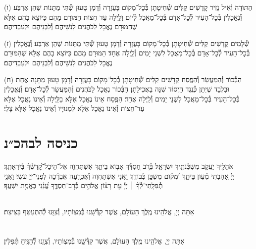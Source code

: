 \documentclass[twoside, openany, parskip=half, 11pt]{book}
\begin{document}
(ו) הַתּוֹדָה וְ֯אֵיל נָזִיר קׇדָשִׁים קַלִּים׃ שְׁ֯חִיטָתָן בְּ֯כׇל־מָקוֹם בָּעֲזָרָה וְ֯דָמָן טָעוּן שְׁ֯תֵּי מַתָּנוֹת שֶׁהֵן אַרְבַּע׃ וְ֯נֶאֱכָלִין בְּ֯כׇל־הָעִיר לְ֯כׇל־אָדָם בְּ֯כׇל־מַאֲכָל לְ֯יוֹם וָלַֽיְלָה עַד חֲצוֹת׃ הַמּוּרָם מֵהֶם כַּיּוֹצֵא בָהֶם אֶלָּא שֶׁהַמּוּרָם נֶאֱכָל לַכֹּהֲנִים לִנְשֵׁיהֶם וְ֯לִבְנֵיהֶם וּלְעַבְדֵיהֶם׃

(ז) שְׁ֯לָמִים קׇדָשִׁים קַלִּים׃ שְׁ֯חִיטָתָן בְּ֯כׇל־מָקוֹם בָּעֲזָרָה וְ֯דָמָן טָעוּן שְׁ֯תֵּי מַתָּנוֹת שֶׁהֵן אַרְבַּע׃ וְ֯נֶאֱכָלִין בְּ֯כׇל־הָעִיר לְ֯כׇל־אָדָם בְּ֯כׇל־מַאֲכָל לִשְׁנֵי יָמִים וְ֯לַֽיְלָה אֶחָד׃ הַמּוּרָם מֵהֶם כַּיּוֹצֵא בָהֶם אֶלָּא שֶׁהַמּוּרָם נֶאֱכָל לַכֹּהֲנִים לִנְשֵׁיהֶם וְ֯לִבְנֵיהֶם וּלְעַבְדֵיהֶם׃

(ח) הַבְּ֯כוֹר וְ֯הַמַּעֲשֵׂר וְ֯הַפֶּֽסַח קׇדָשִׁים קַלִּים׃ שְׁ֯חִיטָתָן בְּ֯כׇל־מָקוֹם בָּעֲזָרָה וְ֯דָמָן טָעוּן מַתָּנָה אֶחָת וּבִלְבָד שֶׁיִּתֵּן כְּ֯נֶֽגֶד הַיְסוֹד שִׁנָּה בַאֲכִילָתָן׃ הַבְּ֯כוֹר נֶאֱכָל לַכֹּהֲנִים וְ֯הַמַּעֲשֵׂר לְ֯כׇל־אָדָם׃ וְ֯נֶּאֱכָלִין בְּ֯כׇל־הָעִיר בְּ֯כׇל־מַאֲכָל לִשְׁנֵי יָמִים וְ֯לַֽיְלָה אֶחָד׃ הַפֶּֽסַח אֵינוֹ נֶאֱכָל אֶלָּא בַלַּֽיְלָה וְ֯אֵינוֹ נֶאֱכָל אֶלָּא עַד־חֲצוֹת וְ֯אֵינוֹ נֶאֱכָל אֶלָּא לִמְנוּיָיו וְ֯אֵינוֹ נֶאֱכָל אֶלָּא צָלִי׃\\


\section[כניסה לבהכ״נ]{ כניסה לבהכ״נ }
אֹהָלֶ֖יךָ יַעֲקֹ֑ב מִשְׁכְּ֯נֹתֶ֖יךָ יִשְׂרָאֵֽל׃
בְּ֯רֹ֣ב חַ֭סְדְּ֯ךָ אָב֣וֹא בֵיתֶ֑ךָ אֶשְׁתַּחֲוֶ֥ה אֶל־הֵיכַל־קׇ֝דְשְׁ֯ךָ֗ בְּ֯יִרְאָתֶֽךָ׃\\
יְיָ֗ אָ֭הַבְתִּי מְ֯ע֣וֹן בֵּיתֶ֑ךָ וּ֝מְק֗וֹם מִשְׁכַּ֥ן כְּ֯בוֹדֶֽךָ׃
וַאֲנִי אֶשְׁתַּחֲוֶה וְ֯אֶכְרָֽעָה אֶבְרְ֯כָה לִפְנֵי־יְיָ עֹשִׂי׃
וַאֲנִ֤י
%
תְ֯פִלָּֽתִי־לְ֯ךָ֨ ׀ יְיָ֡ עֵ֤ת רָצ֗וֹן אֱלֹהִ֥ים בְּ֯רׇב־חַסְדֶּ֑ךָ עֲ֝נֵ֗נִי בֶּאֱמֶ֥ת יִשְׁעֶֽךָ׃

\\
אַתָּה יְיָ, אֱלֹהֵֽינוּ מֶֽלֶךְ הָעוֹלָם, אֲשֶׁר קִדְּ֯שָֽׁנוּ בְּ֯מִצְוֹתָיו, וְ֯צִוָּֽנוּ לְ֯הִתְעַטֵּף בַּצִּיצִת׃\\

\\
\\
אַתָּה יְיָ, אֱלֹהֵֽינוּ מֶֽלֶךְ הָעוֺלָם, אֲשֶׁר קִדְּ֯שָֽׁנוּ בְּ֯מִצְוֹתָיו, וְ֯צִוָֽנוּ לְ֯הַנִּֽיחַ תְּ֯פִלִּין׃
\end{document}
